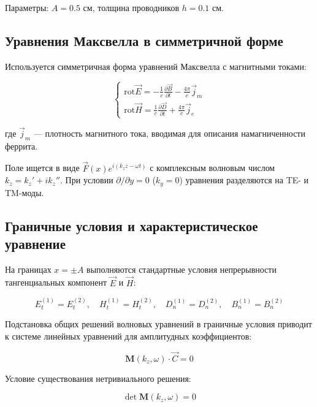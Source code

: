 \documentclass[a4paper,12pt]{article}
\begin{document}
Параметры: $A = 0.5$ см, толщина проводников $h = 0.1$ см.

\subsection{Уравнения Максвелла в симметричной форме}

Используется симметричная форма уравнений Максвелла с магнитными токами:

\begin{equation}
\begin{cases}
\text{rot} \vec{E} = -\frac{1}{c}\frac{\partial \vec{B}}{\partial t} 
- \frac{4\pi}{c}\vec{j}_m \\
\text{rot} \vec{H} = \frac{1}{c}\frac{\partial \vec{D}}{\partial t} 
+ \frac{4\pi}{c}\vec{j}_e
\end{cases}
\label{eq:maxwell_symmetric}
\end{equation}

где $\vec{j}_m$ --- плотность магнитного тока, вводимая для описания
намагниченности феррита.

Поле ищется в виде $\vec{F}(x) e^{i(k_z z - \omega t)}$ с комплексным
волновым числом $k_z = k_z' + i k_z''$. При условии $\partial/\partial y = 0$ 
($k_y = 0$) уравнения разделяются на TE- и TM-моды.

\subsection{Граничные условия и характеристическое уравнение}

На границах $x = \pm A$ выполняются стандартные условия непрерывности
тангенциальных компонент $\vec{E}$ и $\vec{H}$:

\begin{equation}
E_{t}^{(1)} = E_{t}^{(2)}, \quad H_{t}^{(1)} = H_{t}^{(2)}, \quad
D_{n}^{(1)} = D_{n}^{(2)}, \quad B_{n}^{(1)} = B_{n}^{(2)}
\label{eq:boundary_conditions}
\end{equation}

Подстановка общих решений волновых уравнений в граничные условия приводит
к системе линейных уравнений для амплитудных коэффициентов:

\begin{equation}
\mathbf{M}(k_z, \omega) \cdot \vec{C} = 0
\label{eq:linear_system}
\end{equation}

Условие существования нетривиального решения:

\begin{equation}
\det \mathbf{M}(k_z, \omega) = 0
\label{eq:characteristic}
\end{equation}
\end{document}

